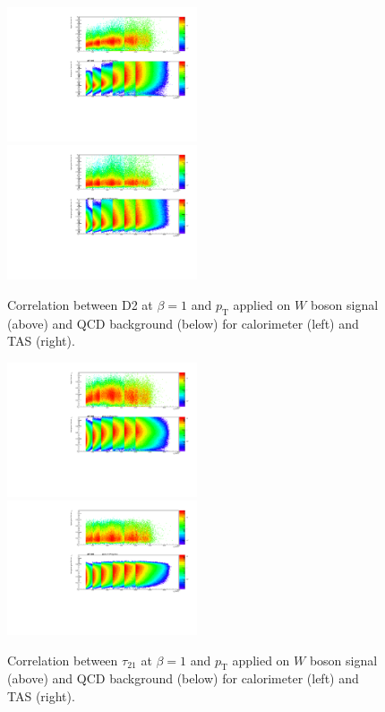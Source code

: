 \begin{figure}[htp]
\includegraphics[width=0.5\textwidth]{sascha_input/plots/W/beta1/scatter_plots/scatter_h_scatter_reco_D2.pdf}
\bigskip
\includegraphics[width=0.5\textwidth]{sascha_input/plots/W/beta1/scatter_plots/scatter_h_scatter_assisted_tj_D2.pdf} 
\caption{\footnotesize{Correlation between D2 at $\beta=1$ and $p_{\mathrm{T}}$ applied on $W$ boson signal (above) and QCD background (below) for calorimeter (left) and TAS (right).}}\label{fig:correlation_D2}
\end{figure}
\begin{figure}[htp]
\includegraphics[width=0.5\textwidth]{sascha_input/plots/W/beta1/scatter_plots/scatter_h_scatter_reco_nSub21.pdf}
\bigskip
\includegraphics[width=0.5\textwidth]{sascha_input/plots/W/beta1/scatter_plots/scatter_h_scatter_assisted_tj_nSub21.pdf} 
\caption{\footnotesize{Correlation between $\tau_{21}$ at $\beta=1$ and $p_{\mathrm{T}}$ applied on $W$ boson signal (above) and QCD background (below) for calorimeter (left) and TAS (right).}}\label{fig:correlation_tau21}
\end{figure}

